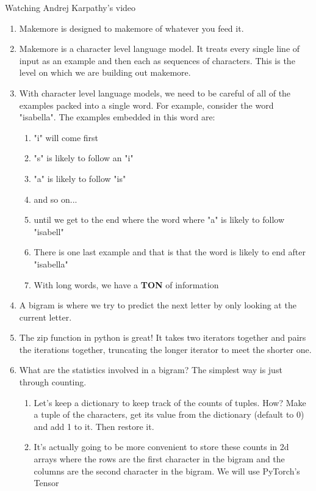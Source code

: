 \documentclass[a4paper, 11pt, oneside]{researchjournal} %
\begin{document}
Watching Andrej Karpathy's video \cite{AndrejKarpathyMakemoreVideo}
\begin{enumerate}
    \item Makemore is designed to makemore of whatever you feed it. 
    \item Makemore is a character level language model. It treats every single line of input as an example and then each as sequences of characters. This is the level on which we are building out makemore. 
    \item With character level language models, we need to be careful of all of the examples packed into a single word. For example, consider the word "isabella". The examples embedded in this word are:
    \begin{enumerate}
        \item "i" will come first
        \item "s" is likely to follow an "i"
        \item "a" is likely to follow "is" 
        \item and so on...
        \item until we get to the end where the word where "a" is likely to follow "isabell"
        \item There is one last example and that is that the word is likely to end after "isabella"
        \item With long words, we have a \textbf{TON} of information
    \end{enumerate}
    \item A bigram is where we try to predict the next letter by only looking at the current letter. 
    \item The zip function in python is great! It takes two iterators together and pairs the iterations together, truncating the longer iterator to meet the shorter one. 
    \item What are the statistics involved in a bigram? The simplest way is just through counting. 
    \begin{enumerate}
        \item Let's keep a dictionary to keep track of the counts of tuples. How? Make a tuple of the characters, get its value from the dictionary (default to 0) and add 1 to it. Then restore it. 
        \item It's actually going to be more convenient to store these counts in 2d arrays where the rows are the first character in the bigram and the columns are the second character in the bigram. We will use PyTorch's Tensor

\end{enumerate}
\end{enumerate}
\end{document}
